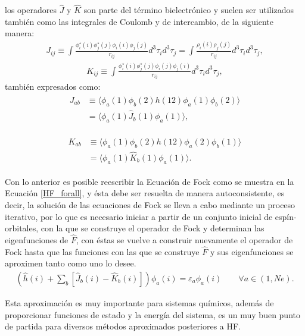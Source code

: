 \noindent los operadores $\hat{J}$ y $\hat{K}$ son parte del término
bielectrónico y suelen ser utilizados también como las integrales de Coulomb y
de intercambio, de la siguiente manera:
%
\begin{align}
  J_{ij} \equiv \int\frac{\phi_{i}^{\star}(i)\phi_{j}^{\star}(j)\phi_{i}(i)\phi_{j}(j)}{r_{ij}}
  d^{3}\tau_{i}d^{3}\tau_{j} =
  \int\frac{\rho_{i}(i)\rho_{j}(j)}{r_{ij}}d^{3}\tau_{i}d^{3}\tau_{j},
\end{align}
\begin{align}
  K_{ij} \equiv \int\frac{\phi_{i}^{\star}(i)\phi_{j}^{\star}(j)\phi_{i}(j)\phi_{j}(i)}{r_{ij}}
  d^{3}\tau_{i}d^{3}\tau_{j} ,
\end{align}
%
\noindent también expresados como:
\begin{align}
  \begin{split}
    J_{ab} & \equiv \langle\phi_{a}(1)\phi_{b}(2)h(12)\phi_{a}(1)\phi_{b}(2) \rangle \\
	         & = \langle\phi_{a}(1) \hat{J}_{b}(1) \phi_{a}(1) \rangle ,
  \end{split}
\end{align}

\begin{align}
  \begin{split}
    K_{ab} & \equiv \langle\phi_{a}(1)\phi_{b}(2)h(12)\phi_{a}(2)\phi_{b}(1) \rangle \\
	         & = \langle\phi_{a}(1) \hat{K}_{b}(1) \phi_{a}(1) \rangle .
  \end{split}
\end{align}

Con lo anterior es posible reescribir la Ecuación de Fock como se muestra en la
Ecuación \ref{HF_forall}, y ésta debe ser resuelta de manera autoconsistente,
es decir, la solución de las ecuaciones de Fock se lleva a cabo mediante un
proceso iterativo, por lo que es necesario iniciar a partir de un conjunto
inicial de espín-orbitales, con la que se construye el operador de Fock y
determinan las eigenfunciones de $\widehat{F}$, con éstas se vuelve a construir
nuevamente el operador de Fock hasta que las funciones con las que se construye
$\widehat{F}$ y sus eigenfunciones se aproximen tanto como uno lo desee.
%
\begin{align}
\left(\widehat{h}(i) + \sum_b [\hat{J}_b (i) - \hat{K}_b (i)]\right)\phi_a (i) =
\varepsilon_a \phi_a (i) \qquad \forall a \in (1,Ne) .
\label{HF_forall}
\end{align}

Esta aproximación es muy importante para sistemas químicos, además de
proporcionar funciones de estado y la energía del sistema, es un muy buen punto
de partida para diversos métodos aproximados posteriores a HF.


